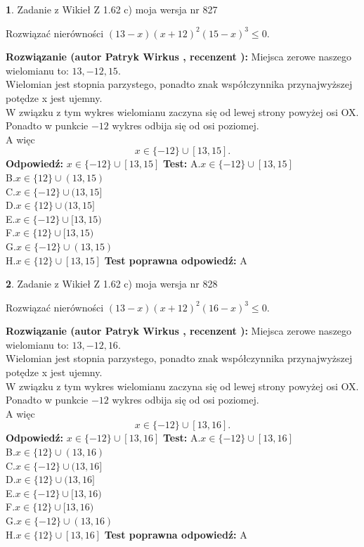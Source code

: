 \documentclass[12pt, a4paper]{article}
\theoremstyle{definition} %
\newtheorem{zad}{}
\newcommand{\zadStart}[1]{\begin{zad}#1\newline}
\newcommand{\zadStop}{\end{zad}}
\newcommand{\rozwStart}[2]{\noindent \textbf{Rozwiązanie (autor #1 , recenzent #2): }\newline}
\newcommand{\rozwStop}{\newline}
\newcommand{\odpStart}{\noindent \textbf{Odpowiedź:}\newline}
\newcommand{\odpStop}{\newline}
\newcommand{\testStart}{\noindent \textbf{Test:}\newline}
\newcommand{\testStop}{\newline}
\newcommand{\kluczStart}{\noindent \textbf{Test poprawna odpowiedź:}\newline}
\newcommand{\kluczStop}{\newline}
\begin{document}
\zadStart{Zadanie z Wikieł Z 1.62 c) moja wersja nr 827}

Rozwiązać nierówności $(13-x)(x+12)^{2}(15-x)^{3}\le0$.
\zadStop
\rozwStart{Patryk Wirkus}{}
Miejsca zerowe naszego wielomianu to: $13, -12, 15$.\\
Wielomian jest stopnia parzystego, ponadto znak współczynnika przy\linebreak najwyższej potędze x jest ujemny.\\ W związku z tym wykres wielomianu zaczyna się od lewej strony powyżej osi OX.\\
Ponadto w punkcie $-12$ wykres odbija się od osi poziomej.\\
A więc $$x \in \{-12\} \cup [13,15].$$
\rozwStop
\odpStart
$x \in \{-12\} \cup [13,15]$
\odpStop
\testStart
A.$x \in \{-12\} \cup [13,15]$\\
B.$x \in \{12\} \cup (13,15)$\\
C.$x \in \{-12\} \cup (13,15]$\\
D.$x \in \{12\} \cup (13,15]$\\
E.$x \in \{-12\} \cup [13,15)$\\
F.$x \in \{12\} \cup [13,15)$\\
G.$x \in \{-12\} \cup (13,15)$\\
H.$x \in \{12\} \cup [13,15]$
\testStop
\kluczStart
A
\kluczStop



\zadStart{Zadanie z Wikieł Z 1.62 c) moja wersja nr 828}

Rozwiązać nierówności $(13-x)(x+12)^{2}(16-x)^{3}\le0$.
\zadStop
\rozwStart{Patryk Wirkus}{}
Miejsca zerowe naszego wielomianu to: $13, -12, 16$.\\
Wielomian jest stopnia parzystego, ponadto znak współczynnika przy\linebreak najwyższej potędze x jest ujemny.\\ W związku z tym wykres wielomianu zaczyna się od lewej strony powyżej osi OX.\\
Ponadto w punkcie $-12$ wykres odbija się od osi poziomej.\\
A więc $$x \in \{-12\} \cup [13,16].$$
\rozwStop
\odpStart
$x \in \{-12\} \cup [13,16]$
\odpStop
\testStart
A.$x \in \{-12\} \cup [13,16]$\\
B.$x \in \{12\} \cup (13,16)$\\
C.$x \in \{-12\} \cup (13,16]$\\
D.$x \in \{12\} \cup (13,16]$\\
E.$x \in \{-12\} \cup [13,16)$\\
F.$x \in \{12\} \cup [13,16)$\\
G.$x \in \{-12\} \cup (13,16)$\\
H.$x \in \{12\} \cup [13,16]$
\testStop
\kluczStart
A
\kluczStop
\end{document}
